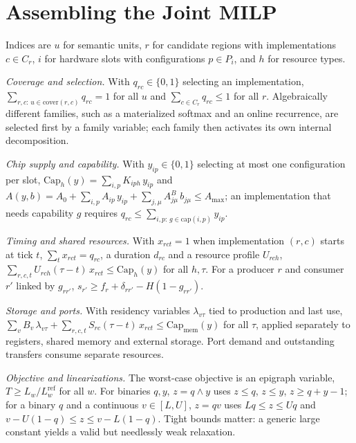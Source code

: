 \documentclass[11pt]{article}
\begin{document}
\section{Assembling the Joint MILP}\label{app:milp}

Indices are \(u\) for semantic units, \(r\) for candidate regions with implementations \(c\in C_r\), \(i\) for hardware slots with configurations \(p\in P_i\), and \(h\) for resource types.

\emph{Coverage and selection.} With \(q_{rc}\in\{0,1\}\) selecting an implementation, \(\sum_{r,c:\,u\in\mathrm{cover}(r,c)}q_{rc}=1\) for all \(u\) and \(\sum_{c\in C_r}q_{rc}\le1\) for all \(r\). Algebraically different families, such as a materialized softmax and an online recurrence, are selected first by a family variable; each family then activates its own internal decomposition.

\emph{Chip supply and capability.} With \(y_{ip}\in\{0,1\}\) selecting at most one configuration per slot, \(\mathrm{Cap}_h(y)=\sum_{i,p}K_{iph}\,y_{ip}\) and \(A(y,b)=A_0+\sum_{i,p}A_{ip}\,y_{ip}+\sum_{j,\mu}A^{B}_{j\mu}\,b_{j\mu}\le A_{\max}\); an implementation that needs capability \(g\) requires \(q_{rc}\le\sum_{i,p:\,g\in\mathrm{cap}(i,p)}y_{ip}\).

\emph{Timing and shared resources.} With \(x_{rct}=1\) when implementation \((r,c)\) starts at tick \(t\), \(\sum_t x_{rct}=q_{rc}\), a duration \(d_{rc}\) and a resource profile \(U_{rch}\), \(\sum_{r,c,t}U_{rch}(\tau-t)\,x_{rct}\le\mathrm{Cap}_h(y)\) for all \(h,\tau\). For a producer \(r\) and consumer \(r'\) linked by \(g_{rr'}\), \(s_{r'}\ge f_r+\delta_{rr'}-H(1-g_{rr'})\).

\emph{Storage and ports.} With residency variables \(\lambda_{v\tau}\) tied to production and last use, \(\sum_v B_v\,\lambda_{v\tau}+\sum_{r,c,t}S_{rc}(\tau-t)\,x_{rct}\le\mathrm{Cap}_{\mathrm{mem}}(y)\) for all \(\tau\), applied separately to registers, shared memory and external storage. Port demand and outstanding transfers consume separate resources.

\emph{Objective and linearizations.} The worst-case objective is an epigraph variable, \(T\ge L_w/L^{\mathrm{ref}}_w\) for all \(w\). For binaries \(q,y\), \(z=q\land y\) uses \(z\le q\), \(z\le y\), \(z\ge q+y-1\); for a binary \(q\) and a continuous \(v\in[L,U]\), \(z=qv\) uses \(Lq\le z\le Uq\) and \(v-U(1-q)\le z\le v-L(1-q)\). Tight bounds matter: a generic large constant yields a valid but needlessly weak relaxation.
\end{document}
